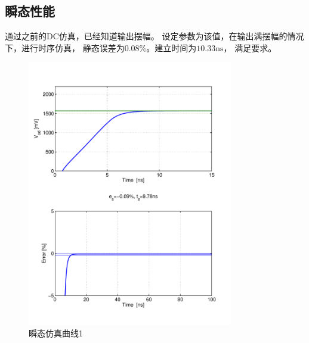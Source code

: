 \documentclass[a4paper]{article}
\newcommand{\uns}{\si{\nano\second}}
\begin{document}
\subsection{瞬态性能}
通过之前的DC仿真，已经知道输出摆幅。
设定参数为该值，在输出满摆幅的情况下，进行时序仿真，
静态误差为$0.08\%$。建立时间为$10.33\uns$，
满足要求。
\begin{figure}[htb]
    \begin{center}
        \includegraphics[width=0.8\textwidth]{common/tran1.pdf}
    \end{center}
    \caption{瞬态仿真曲线1}
    \label{commontran1}
\end{figure}
\end{document}

